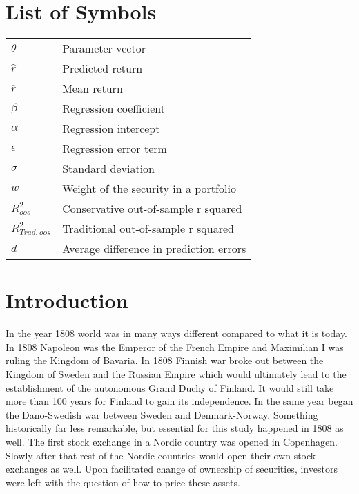 \documentclass[12pt]{article}
\begin{document}
\section*{List of Symbols}
\begin{tabular}{l l}
$\theta$ & Parameter vector\\
$\hat{r}$ & Predicted return\\
$\overline{r}$ & Mean return\\
$\beta$ & Regression coefficient \\
$\alpha$ & Regression intercept\\
$\epsilon$ & Regression error term\\
$\sigma$ & Standard deviation\\
$w$ & Weight of the security in a portfolio\\
$R^2_{oos}$ & Conservative out-of-sample r squared \\
$R^2_{Trad. \ oos}$ & Traditional out-of-sample r squared \\
$d$ & Average difference in prediction errors \\
\end{tabular}

\newpage

\section{Introduction} \label{Introduction}
In the year 1808 world was in many ways different compared to what it is today. In 1808 Napoleon was the Emperor of the French Empire and Maximilian I was ruling the Kingdom of Bavaria. In 1808 Finnish war broke out between the Kingdom of Sweden and the Russian Empire which would ultimately lead to the establishment of the autonomous Grand Duchy of Finland. It would still take more than 100 years for Finland to gain its independence. In the same year began the Dano-Swedish war between Sweden and Denmark-Norway. Something historically far less remarkable, but essential for this study happened in 1808 as well. The first stock exchange in a Nordic country was opened in Copenhagen\footnotemark. Slowly after that rest of the Nordic countries would open their own stock exchanges as well. Upon facilitated change of ownership of securities, investors were left with the question of how to price these assets. \par

\end{document}
